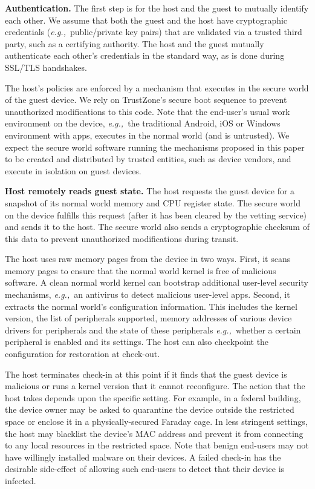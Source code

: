 \documentclass[pageno]{sig-alternate-05-2015}
\newcommand{\emphitem}[1]{\textbf{#1}}
\newcommand*\circled[1]{\tikz[baseline=(char.base)]{
            \node[shape=circle,draw,inner sep=0.5pt] (char) {#1};}}
\newcounter{myctr}
\newenvironment{mylist}{\begin{list}{\textbf{\circled{\arabic{myctr}}}}
{\usecounter{myctr}
\setlength{\topsep}{1mm}\setlength{\itemsep}{0.5mm}
\setlength{\parsep}{0.5mm}
\setlength{\listparindent}{\parindent} %
\setlength{\itemindent}{0mm}\setlength{\partopsep}{0mm}
\setlength{\labelwidth}{-2mm}
\setlength{\leftmargin}{0mm}}}{\end{list}}
\newcommand{\eg}{\textit{e.g.,}}
\newcommand{\addtext}[2]{#2}
\begin{document}
\begin{mylist}
%
\item \emphitem{Authentication.} The first step is for the host and the guest to
mutually identify each other. We assume that both the guest and the host have
cryptographic credentials (\eg~public/private key pairs) that are validated
via a trusted third party, such as a certifying authority. The host and the
guest mutually authenticate each other's credentials in the standard way, as is
done during SSL/TLS handshakes.

The host's policies are enforced by a mechanism that executes in the secure
world of the guest device. We rely on TrustZone's secure boot sequence to
prevent unauthorized modifications to this code. Note that the end-user's usual
work environment on the device, \eg~the traditional Android, iOS or Windows
environment with apps, executes in the normal world (and is untrusted). We
expect the secure world software running the mechanisms proposed in this paper
to be created and distributed by trusted entities, such as device vendors, and
execute in isolation on guest devices.

\item \emphitem{Host remotely reads guest state.} The host requests the guest
device for a snapshot of its normal world memory and CPU register state. The
secure world on the device fulfills this request (after it has been cleared by
the vetting service) and sends it to the host. The secure world also sends a
cryptographic checksum of this data to prevent unauthorized modifications
during transit.

The host uses raw memory pages from the device in two ways. First, it scans
memory pages to ensure that the normal world kernel is free of malicious
software. A clean normal world kernel can bootstrap additional user-level
security mechanisms, \eg~an antivirus to detect malicious user-level apps.
Second, it extracts the normal world's configuration information. This includes
the kernel version, the list of peripherals supported, memory addresses of
various device drivers for peripherals and the state of these peripherals
\eg~whether a certain peripheral is enabled and its settings. The host can also
checkpoint the configuration for restoration at check-out. 

\addtext{Task 7}{The host terminates check-in at this point if it finds that
the guest device is malicious or runs a kernel version that it cannot
reconfigure. The action that the host takes depends upon the specific setting.
For example, in a federal building, the device owner may be asked to quarantine
the device outside the restricted space or enclose it in a physically-secured
Faraday cage. In less stringent settings, the host may blacklist the device's
MAC address and prevent it from connecting to any local resources in the
restricted space. Note that benign end-users may not have willingly installed
malware on their devices. A failed check-in has the desirable side-effect of
allowing such end-users to detect that their device is infected.}


\end{mylist}
\end{document}
